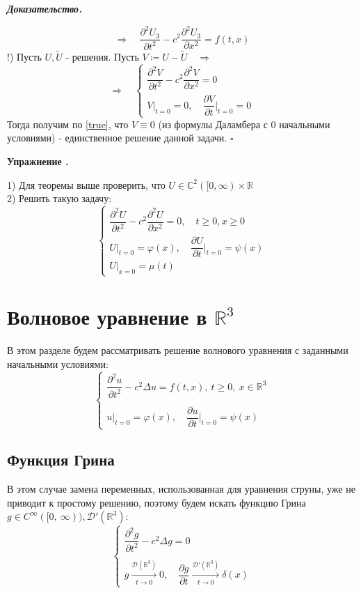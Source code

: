\documentclass[11pt,a4paper]{report}
\numberwithin{equation}{section}
\numberwithin{figure}{chapter}
\numberwithin{table}{chapter}
\newif\ifinmathphysstatement
\newenvironment{myexe}[1][]{%
    \refstepcounter{exectr}%
    \inmathphysstatementtrue
    \begin{tcolorbox}[mathphysblock,colframe=exercisecolor,colback=exercisecolor!3,#1]
    \textbf{\color{exercisecolor}Упражнение \theexectr.}\par\smallskip
}{%
    \end{tcolorbox}
    \inmathphysstatementfalse
}
\newenvironment{myproof}{%
    \begin{tcolorbox}[mathphysblock,colframe=proofcolor!65,colback=proofcolor!2,boxrule=0.5pt]
    \textit{\textbf{Доказательство.}}\par\smallskip
}{%
    \hfill$\square$
    \end{tcolorbox}
}
\newcommand{\R}{\mathbb{R}}
\newcommand{\C}{\mathbb{C}}
\newcommand{\D}{\mathcal{D}}
\newcommand{\p}{\partial}
\renewcommand{\phi}{\varphi}
\begin{document}
\begin{myproof}
   \[\Rightarrow \quad \dfrac{\partial^2 U_3}{\partial t^2}-c^2\dfrac{\partial^2 U_3}{\partial x^2}=f(t, x)\]
   !) Пусть $U, \tilde{U}$ - решения. Пусть $V\coloneqq U-\tilde{U} \quad \Rightarrow$
   \[\Rightarrow \quad \begin{cases}
    \dfrac{\partial^2 V}{\partial t^2}-c^2\dfrac{\partial^2 V}{\partial x^2}=0 \\
    V\big|_{t=0}=0, \quad \dfrac{\partial V}{\partial t}\bigg|_{t=0}=0
   \end{cases}\]
   Тогда получим по \ref{true}, что $V\equiv0$ (из формулы Даламбера с 0 начальными условиями) - единственное решение данной задачи.
\end{myproof}
\begin{myexe}
    1) Для теоремы выше проверить, что \(U\in\C^2([0,\infty)\times\R\) \\
    2) Решить такую задачу: 
    \[\begin{cases}
        \dfrac{\partial^2 U}{\partial t^2}-c^2\dfrac{\partial^2 U}{\partial x^2}=0, \quad t\geq0, x\geq 0 \\
        U\big|_{t=0}=\phi(x), \quad \dfrac{\partial U}{\partial t}\bigg|_{t=0}=\psi(x) \\ 
        U\big|_{x=0}=\mu(t)
    \end{cases}\]
\end{myexe}




\section{Волновое уравнение в \texorpdfstring{$\R^3$}{R3}}
В этом разделе будем рассматривать решение волнового уравнения с заданными начальными условиями:
\[
\begin{cases}
    \dfrac{\p^2 u}{\p t^2} - c^2\Delta u = f(t,x), \ t\geq0, \ x\in\R^3\\
    \\
    u\Big|_{t=0} = \varphi(x), \quad \dfrac{\p u}{\p t}\Big|_{t=0} = \psi(x)
\end{cases}
\]
\subsection{Функция Грина}
В этом случае замена переменных, использованная для уравнения струны, уже не приводит к простому решению, поэтому будем искать функцию Грина $g\in C^\infty([0,\ \infty)),\D'(\R^3) $:
\begin{equation}
\label{eq:green-wave-3d}
\begin{cases}
    \dfrac{\p^2 g}{\p t^2} - c^2\Delta g = 0\\
    \\
    g\xrightarrow[t\to0]{\D(\R^3)}0, \quad \dfrac{\p g}{\p t}\xrightarrow[t\to0]{\D'(\R^3)}\delta(x)
\end{cases}
\end{equation}
\end{document}
